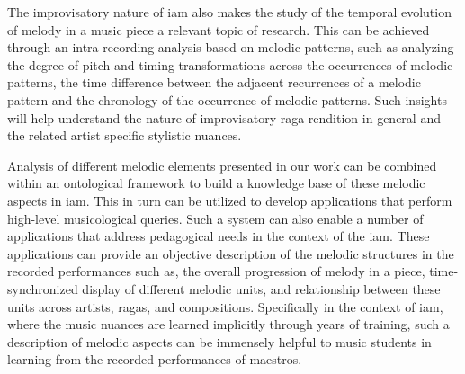 The improvisatory nature of \gls{iam} also makes the study of the temporal evolution of melody in a music piece a relevant topic of research. This can be achieved through an intra-recording analysis based on melodic patterns, such as analyzing the degree of pitch and timing transformations across the occurrences of melodic patterns, the time difference between the adjacent recurrences of a melodic pattern and the chronology of the occurrence of melodic patterns. Such insights will help understand the nature of improvisatory \gls{raga} rendition in general and the related artist specific stylistic nuances.

 Analysis of different melodic elements presented in our work can be combined within an ontological framework to build a knowledge base of these melodic aspects in \gls{iam}. This in turn can be utilized to develop applications that perform high-level musicological queries. Such a system can also enable a number of applications that address pedagogical needs in the context of the \gls{iam}. These applications can provide an objective description of the melodic structures in the recorded performances such as, the overall progression of melody in a piece, time-synchronized display of different melodic units, and relationship between these units across artists, \glspl{raga}, and compositions. Specifically in the context of \gls{iam}, where the music nuances are learned implicitly through years of training, such a description of melodic aspects can be immensely helpful to music students in learning from the recorded performances of maestros.


